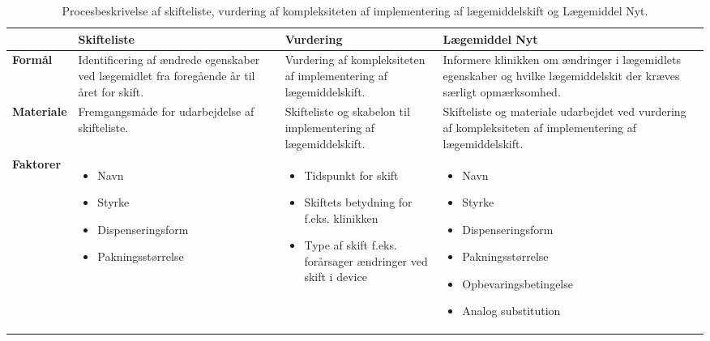 \vspace{0.5cm}
\begin{table}[H]
\caption{Procesbeskrivelse af skifteliste, vurdering af kompleksiteten af implementering af lægemiddelskift og Lægemiddel Nyt.} 
\label{table:Proces}
\begin{tabular}{|p{1.8cm}|p{3.5cm}|p{3.5cm}|p{4.2cm}|} \hline
\cellcolor[HTML]{C0C0C0}\textbf{} & \cellcolor[HTML]{C0C0C0}\textbf{Skifteliste} & \cellcolor[HTML]{C0C0C0}\textbf{Vurdering} & \cellcolor[HTML]{C0C0C0}\textbf{Lægemiddel Nyt}\\ \hline
\cellcolor[HTML]{C0C0C0}\textbf{Formål} & Identificering af ændrede egenskaber ved lægemidlet fra foregående år til året for skift. & Vurdering af kompleksiteten af implementering af lægemiddelskift. & Informere klinikken om ændringer i lægemidlets egenskaber og hvilke lægemiddelskit der kræves særligt opmærksomhed. \\ \hline
\cellcolor[HTML]{C0C0C0}\textbf{Materiale} & Fremgangsmåde for udarbejdelse af skifteliste. & Skifteliste  og skabelon til implementering af lægemiddelskift. & Skifteliste og materiale udarbejdet ved vurdering af kompleksiteten af implementering af lægemiddelskift. \\ \hline
\cellcolor[HTML]{C0C0C0}\textbf{Faktorer} & \vspace{-0.2cm}\begin{itemize}[topsep=-0.5cm,leftmargin=0.3cm] \item Navn \item Styrke\item Dispenseringsform \item Pakningsstørrelse \end{itemize} & \vspace{-0.2cm}\begin{itemize}[topsep=-0.5cm,leftmargin=0.3cm] \item Tidspunkt for skift\item Skiftets betydning for f.eks. klinikken \item Type af skift f.eks. forårsager ændringer ved skift i device \end{itemize}  & \vspace{-0.2cm}\begin{itemize}[topsep=-0.5cm,leftmargin=0.3cm] \item Navn \item Styrke \item Dispenseringsform \item Pakningsstørrelse \item Opbevaringsbetingelse \item Analog substitution  \end{itemize} \\ \hline  
\end{tabular}
\end{table}


